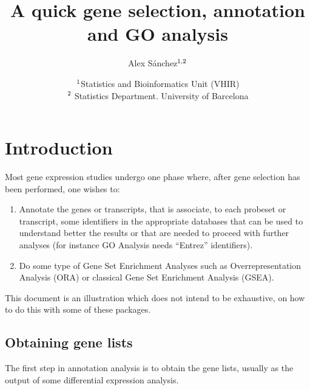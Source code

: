 \documentclass{article}\usepackage[]{graphicx}\usepackage[]{color}
\begin{document}
\title{A quick gene selection, annotation and GO analysis}
\author{Alex S\'anchez$\sp {1,2}$}
\date{$\sp 1$Statistics and Bioinformatics Unit (VHIR)\\
 $\sp 2$ Statistics Department. University of Barcelona}

\maketitle

\tableofcontents






\section{Introduction}

Most gene expression studies undergo one phase where, after gene
selection has been performed, one wishes to:
\begin{enumerate}
\item Annotate the genes or transcripts, that is associate, to each
  probeset or transcript, some identifiers in the appropriate
  databases that can be used to understand better the results or that
  are needed to proceed with further analyses (for instance GO
  Analysis needs ``Entrez'' identifiers).
\item Do some type of Gene Set Enrichment Analyses such as
  Overrepresentation Analysis (ORA) or classical Gene Set Enrichment
  Analysis (GSEA).
\end{enumerate}

This document is an illustration which does not intend to be exhaustive, on how to do this with some of these packages.

\subsection{Obtaining gene lists}

The first step in annotation analysis is to obtain the gene lists,
usually as the output of some differential expression analysis.
\end{document}
